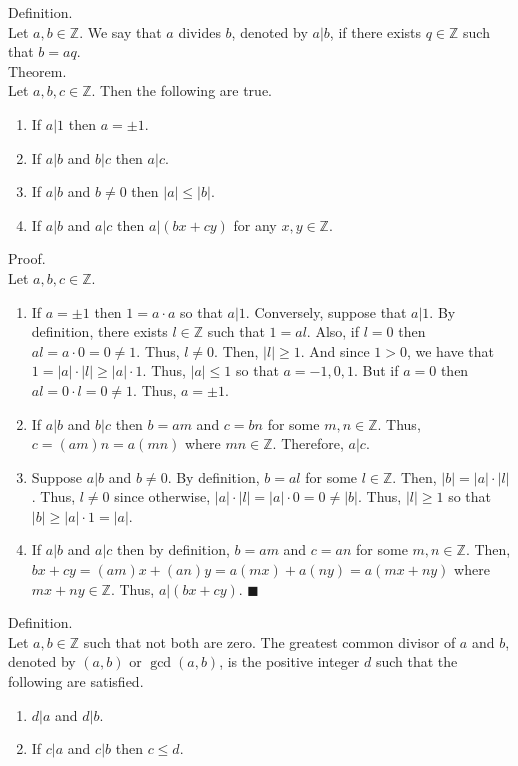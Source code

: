 \documentclass[twocolumn]{article}
\newcommand{\qed}{$\blacksquare$}
\newcommand{\br}{\vspace{\baselineskip}}
\newcommand{\integers}{\mathbb{Z}}
\begin{document}
Definition. \\
Let $a, b \in \integers$. We say that $a$ divides $b$, denoted by $a | b$, if there exists $q \in \integers$ such that $b = aq$. \\

Theorem. \\
Let $a, b, c \in \integers$. Then the following are true.
\begin{enumerate}
	\item
		If $a | 1$ then $a = \pm 1$.
	\item
		If $a | b$ and $b | c$ then $a | c$.
	\item
		If $a | b$ and $b \neq 0$ then $|a| \leq |b|$.
	\item
		If $a | b$ and $a | c$ then $a | (bx + cy)$ for any $x, y \in \integers$.
\end{enumerate}
Proof. \\
Let $a, b, c \in \integers$.
\begin{enumerate}
	\item
		If $a = \pm 1$ then $1 = a \cdot a$ so that $a | 1$. Conversely, suppose that $a | 1$. By definition, there exists $l \in \integers$ such that $1 = al$. Also, if $l = 0$ then $al = a \cdot 0 = 0 \neq 1$. Thus, $l \neq 0$. Then, $|l| \geq 1$. And since $1 > 0$, we have that $1 = |a| \cdot |l| \geq |a| \cdot 1$. Thus, $|a| \leq 1$ so that $a = -1, 0, 1$. But if $a = 0$ then $al = 0 \cdot l = 0 \neq 1$. Thus, $a = \pm 1$.
	\item
		If $a | b$ and $b | c$ then $b = am$ and $c = bn$ for some $m, n \in \integers$. Thus, $c = (am)n = a(mn)$ where $mn \in \integers$. Therefore, $a | c$.
	\item
		Suppose $a | b$ and $b \neq 0$. By definition, $b = al$ for some $l \in \integers$. Then, $|b| = |a| \cdot |l|$. Thus, $l \neq 0$ since otherwise, $|a| \cdot |l| = |a| \cdot 0 = 0 \neq |b|$. Thus, $|l| \geq 1$ so that $|b| \geq |a| \cdot 1 = |a|$.
	\item
		If $a | b$ and $a | c$ then by definition, $b = am$ and $c = an$ for some $m, n \in \integers$. Then, $bx + cy = (am)x + (an)y = a(mx) + a(ny) = a(mx + ny)$ where $mx + ny \in \integers$. Thus, $a | (bx + cy)$. \qed
\end{enumerate} \br

Definition. \\
Let $a, b \in \integers$ such that not both are zero. The greatest common divisor of $a$ and $b$, denoted by $(a, b)$ or $\gcd(a, b)$, is the positive integer $d$ such that the following are satisfied.
\begin{enumerate}
	\item
		$d | a$ and $d | b$.
	\item
		If $c | a$ and $c | b$ then $c \leq d$.
\end{enumerate} \br
\end{document}

